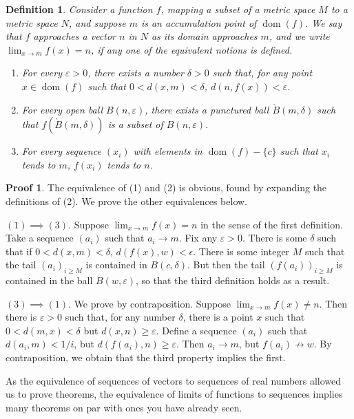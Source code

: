 \documentclass[12pt]{amsbook}
\theoremstyle{plain}
\newtheorem{definition}{Definition}
\theoremstyle{definition}
\newtheorem*{prf}{Proof}
\DeclareMathOperator{\dom}{dom}
\begin{document}
\begin{definition}
  Consider a function $f$, mapping a subset of a metric space $M$ to a metric space $N$, and suppose $m$ is an accumulation point of $\dom(f)$. We say that $f$ approaches a vector $n$ in $N$ as its domain approaches $m$, and we write $\lim_{x \to m} f(x) = n$, if any one of the equivalent notions is defined.

  \begin{enumerate}
    \item For every $\varepsilon > 0$, there exists a number $\delta > 0$ such that, for any point $x \in \dom(f)$ such that $0 < d(x, m) < \delta$, $d(n, f(x)) < \varepsilon$.
    \item For every open ball $B(n,\varepsilon)$, there exists a punctured ball $\mathring{B}(m,\delta)$ such that $f(\mathring{B}(m,\delta))$ is a subset of $B(n,\varepsilon)$.
    \item For every sequence $(x_i)$ with elements in $\dom(f) - \{ c \}$ such that $x_i$ tends to $m$, $f(x_i)$ tends to $n$.
  \end{enumerate}
\end{definition}
\begin{prf}
  The equivalence of (1) and (2) is obvious, found by expanding the definitions of (2). We prove the other equivalences below.

  $(1) \implies (3)$. Suppose $\lim_{x \to m} f(x) = n$ in the sense of the first definition. Take a sequence $(a_i)$ such that $a_i \to m$. Fix any $\varepsilon > 0$. There is some $\delta$ such that if $0 < d(x, m) < \delta$, $d(f(x), w) < \epsilon$. There is some integer $M$ such that the tail $(a_i)_{i \geq M}$ is contained in $B(c,\delta)$. But then the tail $(f(a_i))_{i \geq M}$ is contained in the ball $B(w,\varepsilon)$, so that the third definition holds as a result.

  $(3) \implies (1)$. We prove by contraposition. Suppose $\lim_{x \to m} f(x) \neq n$. Then there is $\varepsilon > 0$ such that, for any number $\delta$, there is a point $x$ such that $0 < d(m,x) < \delta$ but $d(x,n) \geq \varepsilon$. Define a sequence $(a_i)$ such that $d(a_i, m) < 1/i$, but $d(f(a_i),n) \geq \varepsilon$. Then $a_i \to m$, but $f(a_i) \not \to w$. By contraposition, we obtain that the third property implies the first.
\end{prf}

As the equivalence of sequences of vectors to sequences of real numbers allowed us to prove theorems, the equivalence of limits of functions to sequences implies many theorems on par with ones you have already seen.
\end{document}
